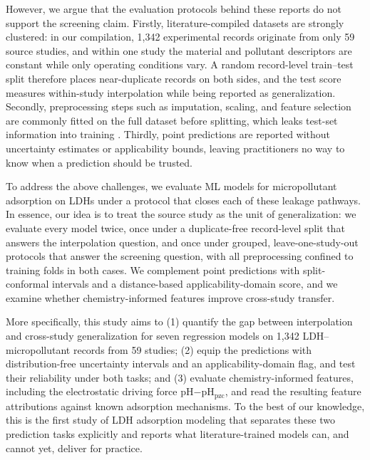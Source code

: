 However, we argue that the evaluation protocols behind these reports do
not support the screening claim. Firstly, literature-compiled datasets
are strongly clustered: in our compilation, 1,342 experimental records
originate from only 59 source studies, and within one study the material
and pollutant descriptors are constant while only operating conditions
vary. A random record-level train--test split therefore places
near-duplicate records on both sides, and the test score measures
within-study interpolation while being reported as generalization.
Secondly, preprocessing steps such as imputation, scaling, and feature
selection are commonly fitted on the full dataset before splitting, which
leaks test-set information into training \citep{kapoor2023leakage}.
Thirdly, point predictions are reported without uncertainty estimates or
applicability bounds, leaving practitioners no way to know when a
prediction should be trusted.

To address the above challenges, we evaluate ML models for micropollutant
adsorption on LDHs under a protocol that closes each of these leakage
pathways. In essence, our idea is
to treat the source study as the unit of generalization: we evaluate every
model twice, once under a duplicate-free record-level split that answers
the interpolation question, and once under grouped, leave-one-study-out
protocols that answer the screening question, with all preprocessing
confined to training folds in both cases. We complement point predictions
with split-conformal intervals and a distance-based applicability-domain
score, and we examine whether chemistry-informed features improve
cross-study transfer.

More specifically, this study aims to (1) quantify the gap between
interpolation and cross-study generalization for seven regression models
on 1,342 LDH--micropollutant records from 59 studies; (2) equip the
predictions with distribution-free uncertainty intervals and an
applicability-domain flag, and test their reliability under both tasks;
and (3) evaluate chemistry-informed features, including the electrostatic
driving force pH$-$pH$_{\mathrm{pzc}}$, and read the resulting feature
attributions against known adsorption mechanisms. To the best of our
knowledge, this is the first study of LDH adsorption modeling that
separates these two prediction tasks explicitly and reports what
literature-trained models can, and cannot yet, deliver for practice.
